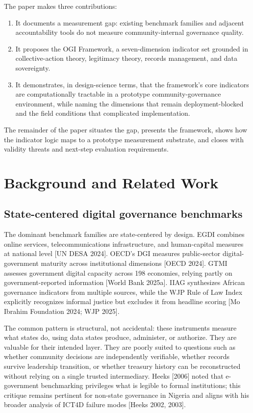 \documentclass[sigconf,anonymous]{acmart}
\begin{document}
The paper makes three contributions:
\begin{enumerate}
\item It documents a measurement gap: existing benchmark families and adjacent accountability tools do not measure community-internal governance quality.
\item It proposes the OGI Framework, a seven-dimension indicator set grounded in collective-action theory, legitimacy theory, records management, and data sovereignty.
\item It demonstrates, in design-science terms, that the framework's core indicators are computationally tractable in a prototype community-governance environment, while naming the dimensions that remain deployment-blocked and the field conditions that complicated implementation.
\end{enumerate}

The remainder of the paper situates the gap, presents the framework, shows how the indicator logic maps to a prototype measurement substrate, and closes with validity threats and next-step evaluation requirements.

\section{Background and Related Work}

\subsection{State-centered digital governance benchmarks}

The dominant benchmark families are state-centered by design. EGDI combines online services, telecommunications infrastructure, and human-capital measures at national level [UN DESA 2024]. OECD's DGI measures public-sector digital-government maturity across institutional dimensions [OECD 2024]. GTMI assesses government digital capacity across 198 economies, relying partly on government-reported information [World Bank 2025a]. IIAG synthesizes African governance indicators from multiple sources, while the WJP Rule of Law Index explicitly recognizes informal justice but excludes it from headline scoring [Mo Ibrahim Foundation 2024; WJP 2025].

The common pattern is structural, not accidental: these instruments measure what states do, using data states produce, administer, or authorize. They are valuable for their intended layer. They are poorly suited to questions such as whether community decisions are independently verifiable, whether records survive leadership transition, or whether treasury history can be reconstructed without relying on a single trusted intermediary. Heeks [2006] noted that e-government benchmarking privileges what is legible to formal institutions; this critique remains pertinent for non-state governance in Nigeria and aligns with his broader analysis of ICT4D failure modes [Heeks 2002, 2003].
\end{document}
